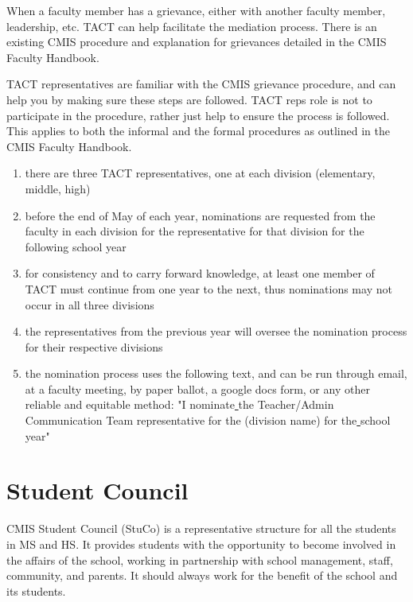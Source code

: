 \documentclass{report}
\begin{document}

When a faculty member has a grievance, either with another faculty member, leadership, etc. TACT can help facilitate the mediation process. There is an existing CMIS procedure and explanation for grievances detailed in the CMIS Faculty Handbook.

TACT representatives are familiar with the CMIS grievance procedure, and can help you by making sure these steps are followed. TACT reps role is not to participate in the procedure, rather just help to ensure the process is followed. This applies to both the informal and the formal procedures as outlined in the CMIS Faculty Handbook.

\begin{enumerate}
\item there are three TACT representatives, one at each division (elementary, middle, high)
\item before the end of May of each year, nominations are requested from the faculty in each division for the representative for that division for the following school year
\item for consistency and to carry forward knowledge, at least one member of  TACT must continue from one year to the next, thus nominations may not occur in all three divisions
\item the representatives from the previous year will oversee the nomination process for their respective divisions
\item the nomination process uses the following text, and can be run through email, at a faculty meeting, by paper ballot, a google docs form, or any other reliable and equitable method:
"I nominate\underline{          }the Teacher/Admin Communication Team representative for the  (division name) for the\underline{          }school year"
\end{enumerate}

\section{Student Council}


CMIS Student Council (StuCo) is a representative structure for all the students in MS and HS.  It provides students with the opportunity to become involved in the affairs of the school, working in partnership with school management, staff, community, and parents.  It should always work for the benefit of the school and its students.  
\end{document}
